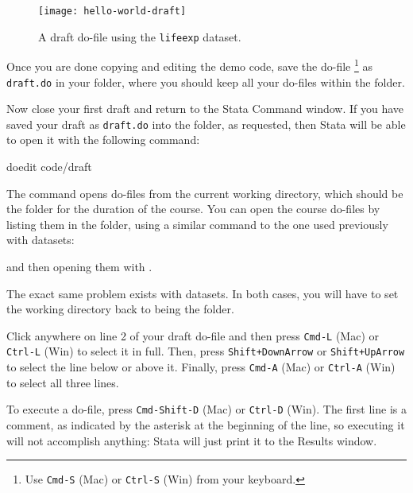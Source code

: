 \begin{description}
		\begin{figure}%
			\texttt{[image: hello-world-draft]}%
			\caption{A draft do-file using the \texttt{lifeexp} dataset.}%
			\label{fig:hello-world-draft}%
		\end{figure}

		\item[\smallcaps{Opening and saving do-files}] Once you are done copying and editing the demo code, save the do-file%
		\footnote{Use \texttt{Cmd-S} (Mac) or \texttt{Ctrl-S} (Win) from your keyboard.} %
		as \texttt{draft.do} in your \code folder, where you should keep all your do-files within the \SRQM folder.%
		
		Now close your first draft and return to the Stata Command window. If you have saved your draft as \texttt{draft.do} into the \code folder, as requested, then Stata will be able to open it with the following command:%

		\begin{docspec}
			doedit code/draft
		\end{docspec}
		
		The  command opens do-files from the current working directory, which should be the \SRQM folder for the duration of the course. You can open the course do-files by listing them in the \code folder, using a similar command to the one used previously with datasets:%
		
		
		 and then opening them with .%
		
		
		 The exact same problem exists with datasets. In both cases, you will have to set the working directory back to being the \SRQM folder.%

		Click anywhere on line 2 of your draft do-file and then press \texttt{Cmd-L} (Mac) or \texttt{Ctrl-L} (Win) to select it in full. Then, press \texttt{Shift+DownArrow} or \texttt{Shift+UpArrow} to select the line below or above it. Finally, press \texttt{Cmd-A} (Mac) or \texttt{Ctrl-A} (Win) to select all three lines.%
 
 		\item[\smallcaps{Running do-files}]

		To execute a do-file, press \texttt{Cmd-Shift-D} (Mac) or \texttt{Ctrl-D} (Win). The first line is a comment, as indicated by the asterisk at the beginning of the line, so executing it will not accomplish anything: Stata will just print it to the Results window.%
  

\end{description}
